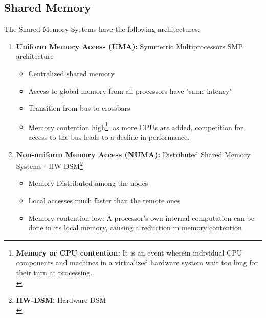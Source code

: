 \documentclass[12pt, a4paper]{report}
\begin{document}
\subsection{Shared Memory}
The Shared Memory Systems have the following architectures:
\begin{enumerate}[label=\bfseries (\Alph*)]
    \item {\bfseries Uniform Memory Access (UMA):} Symmetric Multiprocessors SMP architecture
            \begin{itemize}
                \item Centralized shared memory
                \item Access to global memory from all processors have "same latency"
                \item Transition from bus to crossbars
                \item Memory contention high\footnote[4]{{\bfseries Memory or CPU contention:} It is an event wherein 
                        individual CPU components and machines in a virtualized hardware system wait too long for their 
                        turn at processing.\\[-0.7em]}: as more CPUs are added, competition for access to the bus leads 
                        to a decline in performance.
            \end{itemize} 

    \item {\bfseries Non-uniform Memory Access (NUMA):} Distributed Shared Memory Systems - HW-DSM\footnote[1]{{\bfseries HW-DSM:} Hardware DSM\\[-0.7em]}
            \begin{itemize}
                \item Memory Distributed among the nodes
                \item Local accesses much faster than the remote ones
                \item Memory contention low: A processor's own internal computation can be done in its local memory, causing
                        a reduction in memory contention
            \end{itemize}


\end{enumerate}
\end{document}
